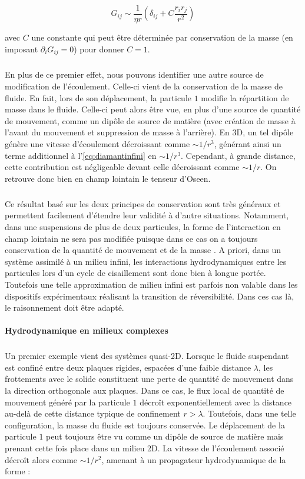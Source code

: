 \begin{equation}
	G_{ij} \sim \frac{1}{\eta r}\left( \delta_{ij}+C\frac{r_ir_j}{r^2} \right)
	\label{eq:diamantinfini}
\end{equation}

\noindent avec $C$ une constante qui peut être déterminée par conservation de la masse (en imposant $\partial_i G_{ij}=0$) pour donner $C=1$.

\subparagraph{}En plus de ce premier effet, nous pouvons identifier une autre source de modification de l'écoulement. Celle-ci vient de la conservation de la masse de fluide. En fait, lors de son déplacement, la particule $1$ modifie la répartition de masse dans le fluide. Celle-ci peut alors être vue, en plus d'une source de quantité de mouvement, comme un dipôle de source de matière (avec création de masse à l'avant du mouvement et suppression de masse à l'arrière). En 3D, un tel dipôle génère une vitesse d'écoulement décroissant comme $\sim 1/r^3$, générant ainsi un terme additionnel à l'\autoref{eq:diamantinfini} en $\sim 1/r^3$. Cependant, à grande distance, cette contribution est négligeable devant celle décroissant comme $\sim 1/r$. On retrouve donc bien en champ lointain le tenseur d'Oseen.

\subparagraph{}Ce résultat basé sur les deux principes de conservation sont très généraux et permettent facilement d'étendre leur validité à d'autre situations. Notamment, dans une suspensions de plus de deux particules, la forme de l'interaction en champ lointain ne sera pas modifiée puisque dans ce cas on a toujours conservation de la quantité de mouvement et de la masse \cite{diamant_hydrodynamic_2009}. A priori, dans un système assimilé à un milieu infini, les interactions hydrodynamiques entre les particules lors d'un cycle de cisaillement sont donc bien à longue portée. Toutefois une telle approximation de milieu infini est parfois non valable dans les dispositifs expérimentaux réalisant la transition de réversibilité. Dans ces cas là, le raisonnement doit être adapté.

\paragraph{Hydrodynamique en milieux complexes}

\subparagraph{}Un premier exemple vient des systèmes quasi-2D. Lorsque le fluide suspendant est confiné entre deux plaques rigides, espacées d'une faible distance $\lambda$, les frottements avec le solide constituent une perte de quantité de mouvement dans la direction orthogonale aux plaques. Dans ce cas, le flux local de quantité de mouvement généré par la particule $1$ décroît exponentiellement avec la distance au-delà de cette distance typique de confinement $r>\lambda$. Toutefois, dans une telle configuration, la masse du fluide est toujours conservée. Le déplacement de la particule $1$ peut toujours être vu comme un dipôle de source de matière mais prenant cette fois place dans un milieu 2D. La vitesse de l'écoulement associé décroît alors comme $\sim 1/r^2$, amenant à un propagateur hydrodynamique de la forme :

